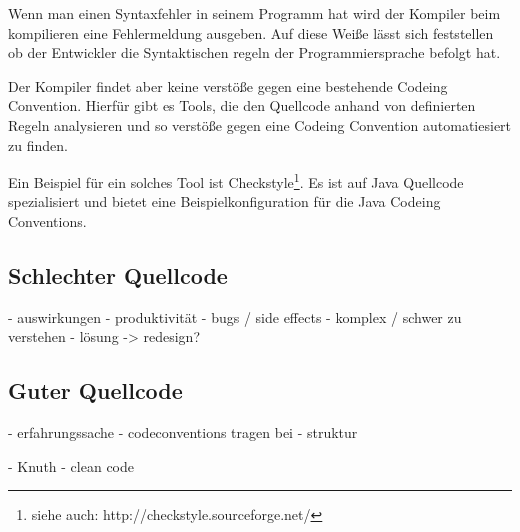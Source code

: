 Wenn man einen Syntaxfehler in seinem Programm hat wird
der Kompiler beim kompilieren eine Fehlermeldung ausgeben.
Auf diese Weiße lässt sich feststellen ob der Entwickler
die Syntaktischen regeln der Programmiersprache befolgt hat.

Der Kompiler findet aber keine verstöße gegen eine bestehende Codeing Convention.
Hierfür gibt es Tools, die den Quellcode anhand von definierten Regeln analysieren
und so verstöße gegen eine Codeing Convention automatiesiert zu finden.

Ein Beispiel für ein solches Tool ist Checkstyle\footnote{siehe auch: http://checkstyle.sourceforge.net/}.
Es ist auf Java Quellcode spezialisiert und bietet eine Beispielkonfiguration für
die Java Codeing Conventions.

\subsection{Schlechter Quellcode}

 - auswirkungen
   - produktivität
 - bugs / side effects
 - komplex / schwer zu verstehen
 - lösung -> redesign?

\subsection{Guter Quellcode}

 - erfahrungssache
 - codeconventions tragen bei
 - struktur

 - Knuth
 - clean code

